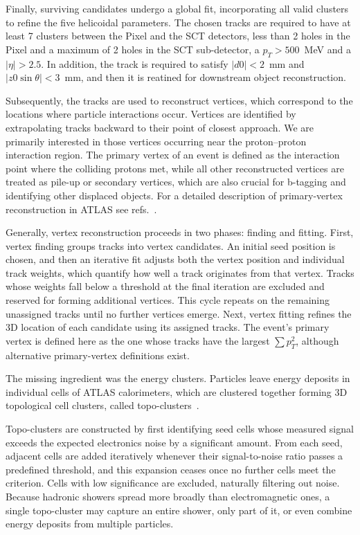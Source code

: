 Finally, surviving candidates undergo a global fit, incorporating all valid clusters to refine the five helicoidal parameters. The chosen tracks are required to have at least 7 clusters between the Pixel and the SCT detectors, less than 2 holes in the Pixel and a maximum of 2 holes in the SCT sub-detector, a $p_{T} > 500$~MeV and a $|\eta|>2.5$. In addition, the track is required to satisfy $|d0|<2$~mm and $|z0\sin\theta|<3$~mm, and then it is reatined for downstream object reconstruction.

Subsequently, the tracks are used to reconstruct vertices, which correspond to the locations where particle interactions occur. Vertices are identified by extrapolating tracks backward to their point of closest approach. We are primarily interested in those vertices occurring near the proton–proton interaction region. The primary vertex of an event is defined as the interaction point where the colliding protons met, while all other reconstructed vertices are treated as pile-up or secondary vertices, which are also crucial for 
b-tagging and identifying other displaced objects. For a detailed description of primary-vertex reconstruction in ATLAS see refs.~\cite{vertex_run1,vertex_run2,vertex_run3}.

Generally, vertex reconstruction proceeds in two phases: finding and fitting. First, vertex finding groups tracks into vertex candidates. An initial seed position is chosen, and then an iterative fit adjusts both the vertex position and individual track weights, which quantify how well a track originates from that vertex. Tracks whose weights fall below a threshold at the final iteration are excluded and reserved for forming additional vertices. This cycle repeats on the remaining unassigned tracks until no further vertices emerge. 
Next, vertex fitting refines the 3D location of each candidate using its assigned tracks. The event’s primary vertex is defined here as the one whose tracks have the largest $\sum p^2_{T}$, although alternative primary-vertex definitions exist.

The missing ingredient was the energy clusters. Particles leave energy deposits in individual cells of ATLAS calorimeters, which are clustered together forming 3D topological cell clusters, called topo-clusters~\cite{topo}.

Topo-clusters are constructed by first identifying seed cells whose measured signal exceeds the expected electronics noise by a significant amount. From each seed, adjacent cells are added iteratively whenever their signal-to-noise ratio passes a predefined threshold, and this expansion ceases once no further cells meet the criterion. Cells with low significance are excluded, naturally filtering out noise. Because hadronic showers spread more broadly than electromagnetic ones, a single topo-cluster may capture an entire shower, only part of it, or even combine energy deposits from multiple particles. 

